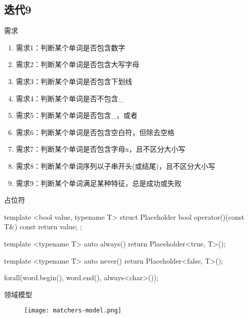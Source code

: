 \subsection{迭代9}

\begin{frame}{需求}
  \begin{block}{}
    \begin{enumerate}
    \item \alert{需求1}：判断某个单词是否包含数字
    \item \alert{需求2}：判断某个单词是否包含大写字母
    \item \alert{需求3}：判断某个单词是否包含下划线 
    \item \alert{需求4}：判断某个单词是否不包含\_
    \item \alert{需求5}：判断某个单词是否包含\_，或者\*     
    \item \alert{需求6}：判断某个单词是否包含空白符，但除去空格
    \item \alert{需求7}：判断某个单词是否包含字母x，且不区分大小写
    \item \alert{需求8}：判断某个单词序列以子串开头(或结尾)，且不区分大小写        
    \item<alert@1-> 需求9：判断某个单词满足某种特征，总是成功或失败    
    \end{enumerate}
  \end{block}
\end{frame}

\begin{frame}[fragile]{占位符}
  \begin{c++}
  template <bool value, typename T>
  struct Placeholder {
    bool operator()(const T&) const {
      return value;
    }
  };

  template <typename T>
  auto always() {
    return Placeholder<true, T>();
  }

  template <typename T>
  auto never() {
    return Placeholder<false, T>();
  }

  forall(word.begin(), word.end(), always<char>());  
  \end{c++}
\end{frame}

\begin{frame}[fragile]{领域模型}
  \begin{figure}
    \centering
    \texttt{[image: matchers-model.png]}
  \end{figure}
\end{frame}